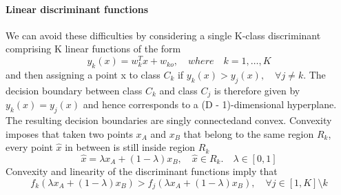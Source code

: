 \documentclass[main.tex]{subfiles}
\begin{document}
\newpage
\paragraph{Linear discriminant functions}
We can avoid these difficulties by considering a single K-class discriminant comprising K linear functions of the form
\begin{equation}
    y_k(x) = w_k^Tx + w_{ko},\quad where \quad k=1,\dots,K
\end{equation}
and then assigning a point x to class $C_k$ if $y_k(x) > y_j (x), \quad \forall j \neq k$. The decision boundary between class $C_k$ and class $C_j$ is therefore given by $y_k(x) = y_j(x)$ and hence corresponds to a (D - 1)-dimensional hyperplane.
The resulting decision boundaries are singly connected\footnotemark and convex. Convexity imposes that taken two points $x_A$ and $x_B$ that belong to the same region $R_k$, every point $\hat{x}$ in between is still inside region $R_k$
\begin{equation*}
    \hat{x} = \lambda x_A + (1-\lambda)x_B, \quad \hat{x}\in R_k. \quad \lambda \in [0, 1]
\end{equation*}
Convexity and linearity of the discriminant functions imply that
\begin{equation*}
    f_k(\lambda x_A + (1-\lambda)x_B) > f_j(\lambda x_A + (1-\lambda)x_B), \quad \forall j \in [1, K] \setminus k
\end{equation*}
\end{document}
